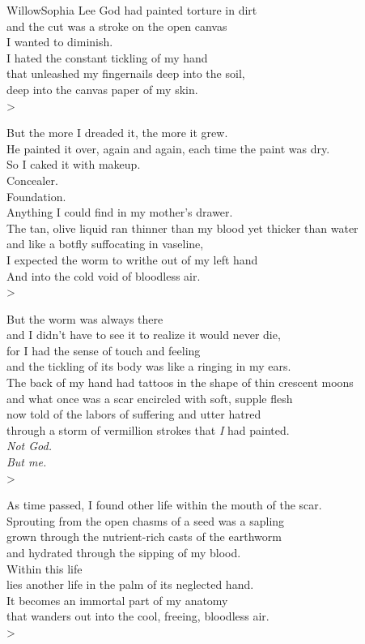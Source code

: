 \begin{poetry}{Willow}{Sophia Lee}
    God had painted torture in dirt\\
    and the cut was a stroke on the open canvas\\
    I wanted to diminish.\\
    I hated the constant tickling of my hand\\
    that unleashed my fingernails deep into the soil,\\
    deep into the canvas paper of my skin.\\>
    
    But the more I dreaded it, the more it grew.\\
    He painted it over, again and again, each time the paint was dry.\\
    So I caked it with makeup.\\
    Concealer.\\
    Foundation.\\
    Anything I could find in my mother's drawer.\\
    The tan, olive liquid ran thinner than my blood yet thicker than water\\
    and like a botfly suffocating in vaseline,\\
    I expected the worm to writhe out of my left hand\\
    And into the cold void of bloodless air.\\>
    
    But the worm was always there\\
    and I didn't have to see it to realize it would never die,\\
    for I had the sense of touch and feeling\\
    and the tickling of its body was like a ringing in my ears.\\
    The back of my hand had tattoos in the shape of thin crescent moons\\
    and what once was a scar encircled with soft, supple flesh\\
    now told of the labors of suffering and utter hatred\\
    through a storm of vermillion strokes that \textit{I} had painted.\\
    \textit{Not God.}\\
    \textit{But me.}\\>
    
    As time passed, I found other life within the mouth of the scar.\\
    Sprouting from the open chasms of a seed was a sapling\\
    grown through the nutrient-rich casts of the earthworm\\
    and hydrated through the sipping of my blood.\\
    Within this life\\
    lies another life in the palm of its neglected hand.\\
    It becomes an immortal part of my anatomy\\
    that wanders out into the cool, freeing, bloodless air.\\>
    

\end{poetry}
